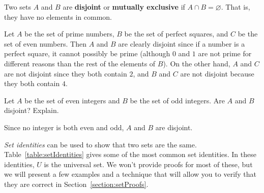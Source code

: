 \begin{df}
Two sets  $A$ and $B$ are {\bf disjoint} or {\bf mutually exclusive}
if $A\cap B = \varnothing$.  That is, they have no elements in common.
\end{df}

\begin{absolutelynopagebreak}
\begin{exa}
Let $A$ be the set of prime numbers, $B$ be the set of perfect squares, and
$C$ be the set of even numbers.
Then $A$ and $B$ are clearly disjoint since if a number is a perfect square,
it cannot possibly be prime (although $0$ and $1$ are not prime for different
reasons than the rest of the elements of $B$).
On the other hand, $A$ and $C$ are not disjoint since they both
contain $2$, and $B$ and $C$ are not disjoint because they both contain $4$.
\end{exa}
\end{absolutelynopagebreak}

\begin{exer}
Let $A$ be the set of even integers and $B$ be the set of odd integers.
Are $A$ and $B$ disjoint?  Explain.

\noindent
\answerlinetwo
\begin{answer}
Since no integer is both even and odd, $A$ and $B$ are disjoint.
\end{answer} 
\end{exer}

{\em Set identities} can be used to show that two sets are the same.
Table~\ref{table:setIdentities} gives some of the most common set identities.
In these identities, $U$ is the universal set.  We won't provide proofs for most of these,
but we will present a few examples and a technique that will allow you to verify that they 
are correct in Section~\ref{section:setProofs}.
 
